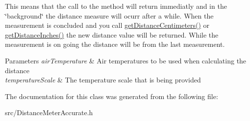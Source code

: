 This means that the call to the method will return immediatly and in the \char`\"{}background\char`\"{} the distance measure will ocurr after a while. When the measurement is concluded and you call \hyperlink{class_easyuino_1_1_distance_meter_accurate_a4de44a347db0bebbf5d74f12397cd4d9}{get\+Distance\+Centimeters()} or \hyperlink{class_easyuino_1_1_distance_meter_a4e3c650c54382d9af6bca51dcac4e7a3}{get\+Distance\+Inches()} the new distance value will be returned. While the measurement is on going the distance will be from the last measurement. 
\begin{DoxyParams}{Parameters}
{\em air\+Temperature} & Air temperatures to be used when calculating the distance \\
\hline
{\em temperature\+Scale} & The temperature scale that is being provided \\
\hline
\end{DoxyParams}


The documentation for this class was generated from the following file\+:\begin{DoxyCompactItemize}
\item 
src/Distance\+Meter\+Accurate.\+h\end{DoxyCompactItemize}
